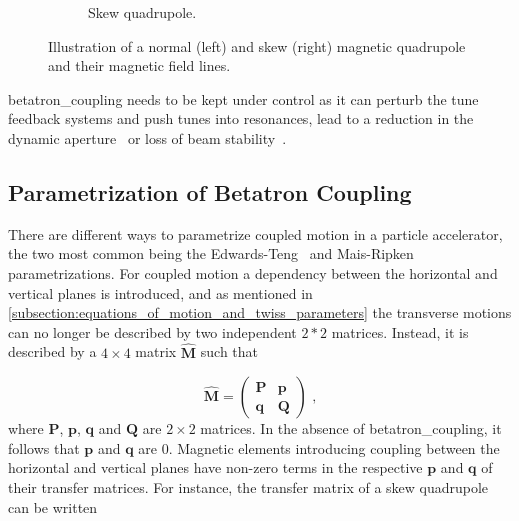 \begin{figure}[!hbt]
\begin{subfigure}[b]{0.49\textwidth}
        \caption{Skew quadrupole.}
        \label{subfigure:skew_quadrupole}
    \end{subfigure}
    \caption{Illustration of a \gls{normal} (left) and \gls{skew} (right) magnetic quadrupole and their magnetic field lines.}
    \label{figure:normal_vs_skew_quadrupole}
\end{figure}

\Gls{betatron_coupling} needs to be kept under control as it can perturb the tune feedback systems and push tunes into resonances, lead to a reduction in the dynamic aperture~\cite{PA:Ripken:Impact_Linear_Coupling_Nonlinear_Dynamics} or loss of beam stability~\cite{MASTERS:Soubelet:Optics_Octupole_PyHEADTAIL,PRAB:Carver:Transverse_Instabilities_With_Coupling}.

\subsection{Parametrization of Betatron Coupling}
\label{subsection:parametrization_of_betatron_coupling}

There are different ways to parametrize coupled motion in a particle accelerator, the two most common being the Edwards-Teng~\cite{IEEE:Edwards:Parametrization_Linear_Coupled_Motion} and Mais-Ripken~\cite{AIP:Willeke:Methods_Beam_Optics} parametrizations.
For coupled motion a dependency between the horizontal and vertical planes is introduced, and as mentioned in \cref{subsection:equations_of_motion_and_twiss_parameters} the transverse motions can no longer be described by two independent \(2 * 2\) matrices.
Instead, it is described by a \(4 \times 4\) matrix \(\hat{\mathbf{M}}\) such that

\begin{equation}
    \hat{\mathbf{M}} = \begin{pmatrix}
        \mathbf{P} & \mathbf{p} \\
        \mathbf{q} & \mathbf{Q}
    \end{pmatrix} \text{ ,}
    \label{equation:coupled_motion_matrix}
\end{equation}
where \(\mathbf{P}\), \(\mathbf{p}\), \(\mathbf{q}\) and \(\mathbf{Q}\) are \(2 \times 2\) matrices.
In the absence of \gls{betatron_coupling}, it follows that \(\mathbf{p}\) and \(\mathbf{q}\) are \num{0}.
Magnetic elements introducing coupling between the horizontal and vertical planes have non-zero terms in the respective \(\mathbf{p}\) and \(\mathbf{q}\) of their transfer matrices.
For instance, the transfer matrix of a \gls{skew} quadrupole can be written

